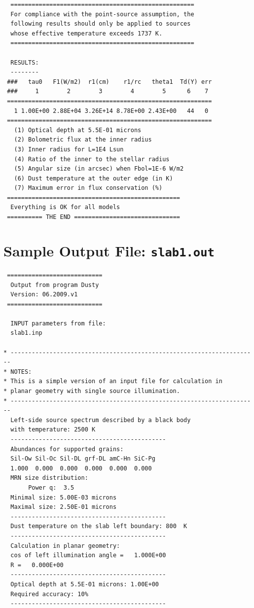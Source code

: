 \documentclass[11pt]{article}
\begin{document}
\begin{appendix}
\begin{verbatim}
  ====================================================
  For compliance with the point-source assumption, the
  following results should only be applied to sources
  whose effective temperature exceeds 1737 K.
  ====================================================

  RESULTS:
  --------
 ###   tau0   F1(W/m2)  r1(cm)    r1/rc   theta1  Td(Y) err
 ###     1        2        3        4        5      6    7
 ==========================================================
   1 1.00E+00 2.88E+04 3.26E+14 8.78E+00 2.43E+00   44   0
 ==========================================================
   (1) Optical depth at 5.5E-01 microns
   (2) Bolometric flux at the inner radius
   (3) Inner radius for L=1E4 Lsun
   (4) Ratio of the inner to the stellar radius
   (5) Angular size (in arcsec) when Fbol=1E-6 W/m2
   (6) Dust temperature at the outer edge (in K)
   (7) Maximum error in flux conservation (%)
 =================================================
  Everything is OK for all models
 ========== THE END ==============================
\end{verbatim}


\section{Sample Output File: \tt slab1.out}
\label{slab1}
\begin{verbatim}
 ===========================
  Output from program Dusty
  Version: 06.2009.v1
 ===========================

  INPUT parameters from file:
  slab1.inp

* ----------------------------------------------------------------------
* NOTES:
* This is a simple version of an input file for calculation in
* planar geometry with single source illumination.
* ----------------------------------------------------------------------
  Left-side source spectrum described by a black body
  with temperature: 2500 K
  --------------------------------------------
  Abundances for supported grains:
  Sil-Ow Sil-Oc Sil-DL grf-DL amC-Hn SiC-Pg
  1.000  0.000  0.000  0.000  0.000  0.000
  MRN size distribution:
       Power q:  3.5
  Minimal size: 5.00E-03 microns
  Maximal size: 2.50E-01 microns
  --------------------------------------------
  Dust temperature on the slab left boundary: 800  K
  --------------------------------------------
  Calculation in planar geometry:
  cos of left illumination angle =   1.000E+00
  R =   0.000E+00
  --------------------------------------------
  Optical depth at 5.5E-01 microns: 1.00E+00
  Required accuracy: 10%
  --------------------------------------------



\end{verbatim}
\end{appendix}
\end{document}
